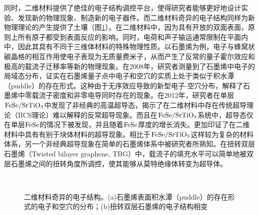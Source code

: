     同时，二维材料提供了绝佳的电子结构调控平台，使得研究者能够更好地设计实验、发现新的物理现象、制造新的电子器件。而二维材料奇异的电子结构同样为新物理理论的产生提供了土壤（图\ref{fig:intro_2DM-fancyElectronStructure}）。在二维材料中，因为具有开放的双面表面，原则上所有原子都受到表面反应的影响。同时，电荷和声子输运通常限制在平面内中，因此其具有不同于三维体材料的特殊物理性质。以石墨烯为例，电子与蜂窝状碳晶格的相互作用使电子表现为无质量费米子，从而产生了反常的量子霍尔效应和极高的载流子迁移率等新的物理现象。在2008年，研究者测量到了石墨烯中电子的局域态分布，证实在石墨烯量子点中电子和空穴的实质上处于类似于积水潭（puddle）的存在形式。这种由于无序效应导致的新型电子-空穴分布，解释了石墨烯中零载流子密度和非零电导同时存在的现象。在2012年，研究者在单层$\rm{FeSe/SrTiO_{3}}$中发现了非经典的高温超导态，揭示了在二维材料中存在传统超导理论（BCS理论）难以解释的反常超导现象。而且在$\rm{FeSe/SrTiO_{3}}$系统中，超导态仅在单层$\rm{FeSe}$的情况下被发现，并且随着$\rm{FeSe}$厚度的增长消失。更加印证了在二维材料中具有有别于块体材料的超导现象。相比于$\rm{FeSe/SrTiO_{3}}$这样较为复杂的材料体系，另一个非经典超导现象在简单的石墨烯体系中被研究者所熟知。在扭转双层石墨烯（Twisted bilayer graphene, TBG）中，载流子的填充水平可以简单地被双层石墨烯之间的扭转角度所调控，使其能够从莫特绝缘体转变为超导体。

    \begin{figure}[htb]
        \\
        \caption{二维材料奇异的电子结构。(a)石墨烯表面积水潭（puddle）的存在形式的电子和空穴的分布；(b)扭转双层石墨烯的电子结构相变}
        \label{fig:intro_2DM-fancyElectronStructure}
    \end{figure}


